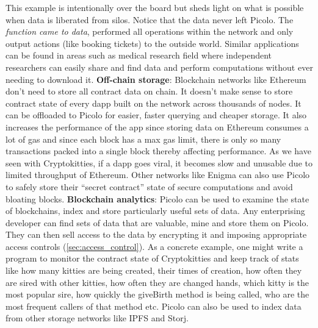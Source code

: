 This example is intentionally over the board but sheds light on what is possible when data is liberated from silos. Notice that the data never left \textsf{Picolo}. The \textit{function came to data}, performed all operations within the network and only output actions (like booking tickets) to the outside world. Similar applications can be found in areas such as medical research field where independent researchers can easily share and find data and perform computations without ever needing to download it.  
\newline\newline
\textbf{Off-chain storage}: Blockchain networks like Ethereum don't need to store all contract data on chain. It doesn't make sense to store contract state of every dapp built on the network across thousands of nodes. It can be offloaded to \textsf{Picolo} for easier, faster querying and cheaper storage. It also increases the performance of the app since storing data on Ethereum consumes a lot of gas and since each block has a max gas limit, there is only so many transactions packed into a single block thereby affecting performance. As we have seen with Cryptokitties, if a dapp goes viral, it becomes slow and unusable due to limited throughput of Ethereum. Other networks like Enigma \cite{enigma} can also use \textsf{Picolo} to safely store their ``secret contract'' state of secure computations and avoid bloating blocks.
\newline\newline
\textbf{Blockchain analytics}: \textsf{Picolo} can be used to examine the state of blockchains, index and store particularly useful sets of data. Any enterprising developer can find sets of data that are valuable, mine and store them on \textsf{Picolo}. They can then sell access to the data by encrypting it and imposing appropriate access controls (\cref{sec:access_control}). As a concrete example, one might write a program to monitor the contract state of Cryptokitties and keep track of stats like how many kitties are being created, their times of creation, how often they are sired with other kitties, how often they are changed hands, which kitty is the most popular sire, how quickly the \textsf{giveBirth} method is being called, who are the most frequent callers of that method etc. \textsf{Picolo} can also be used to index data from other storage networks like IPFS and Storj. 

